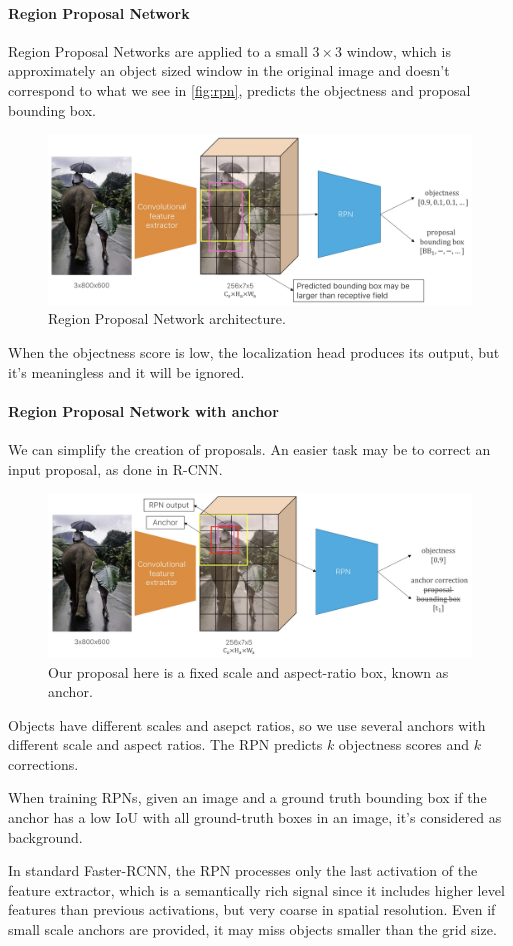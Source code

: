 \documentclass{article}
\begin{document}
\paragraph{Region Proposal Network}

Region Proposal Networks are applied to a small $3\times 3$ window, which is approximately an object sized window in the original image and doesn't correspond to what we see in \ref{fig:rpn}, predicts the objectness and proposal bounding box.

\begin{figure}[htbp]
  \centering
  \includegraphics[width=0.6\linewidth]{./img/rpn.jpg}
  \caption{Region Proposal Network architecture.}
\end{figure}

When the objectness score is low, the localization head produces its output, but it's meaningless and it will be ignored.

\paragraph{Region Proposal Network with anchor}
We can simplify the creation of proposals.
An easier task may be to correct an input proposal, as done in R-CNN.

\begin{figure}[htbp]
  \centering
  \includegraphics[width=0.6\linewidth]{./img/rpn_anchor.jpg}
  \caption{Our proposal here is a fixed scale and aspect-ratio box, known as anchor.}
\end{figure}

Objects have different scales and asepct ratios, so we use several anchors with different scale and aspect ratios.
The RPN predicts $k$ objectness scores and $k$ corrections.

When training RPNs, given an image and a ground truth bounding box if the anchor has a low IoU with all ground-truth boxes in an image, it's considered as background.

In standard Faster-RCNN, the RPN processes only the last activation of the feature extractor, which is a semantically rich signal since it includes higher level features than previous activations, but very coarse in spatial resolution.
Even if small scale anchors are provided, it may miss objects smaller than the grid size.

\end{document}
